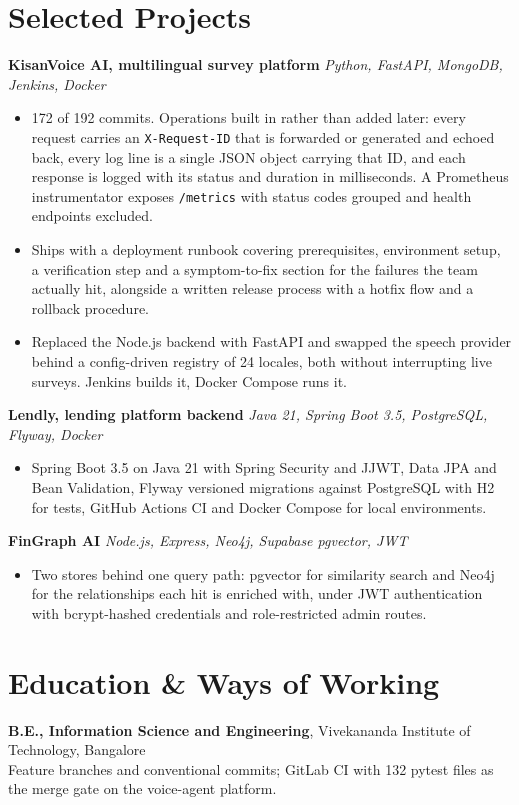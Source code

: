 \documentclass[10pt,a4paper]{article}
\begin{document}
\section{Selected Projects}
\textbf{KisanVoice AI, multilingual survey platform} \textit{Python, FastAPI, MongoDB, Jenkins, Docker}
\begin{itemize}
  \item 172 of 192 commits. Operations built in rather than added later: every request carries an
        \texttt{X-Request-ID} that is forwarded or generated and echoed back, every log line is a
        single JSON object carrying that ID, and each response is logged with its status and duration
        in milliseconds. A Prometheus instrumentator exposes \texttt{/metrics} with status codes
        grouped and health endpoints excluded.
  \item Ships with a deployment runbook covering prerequisites, environment setup, a verification step
        and a symptom-to-fix section for the failures the team actually hit, alongside a written
        release process with a hotfix flow and a rollback procedure.
  \item Replaced the Node.js backend with FastAPI and swapped the speech provider behind a
        config-driven registry of 24 locales, both without interrupting live surveys. Jenkins builds
        it, Docker Compose runs it.
\end{itemize}

\vspace{1pt}
\textbf{Lendly, lending platform backend} \textit{Java 21, Spring Boot 3.5, PostgreSQL, Flyway, Docker}
\begin{itemize}
  \item Spring Boot 3.5 on Java 21 with Spring Security and JJWT, Data JPA and Bean Validation, Flyway
        versioned migrations against PostgreSQL with H2 for tests, GitHub Actions CI and Docker
        Compose for local environments.
\end{itemize}

\vspace{1pt}
\textbf{FinGraph AI} \textit{Node.js, Express, Neo4j, Supabase pgvector, JWT}
\begin{itemize}
  \item Two stores behind one query path: pgvector for similarity search and Neo4j for the
        relationships each hit is enriched with, under JWT authentication with bcrypt-hashed
        credentials and role-restricted admin routes.
\end{itemize}

\section{Education \& Ways of Working}
\textbf{B.E., Information Science and Engineering}, Vivekananda Institute of Technology, Bangalore\\
Feature branches and conventional commits; GitLab CI with 132 pytest files as the merge gate on the
voice-agent platform.
\end{document}
